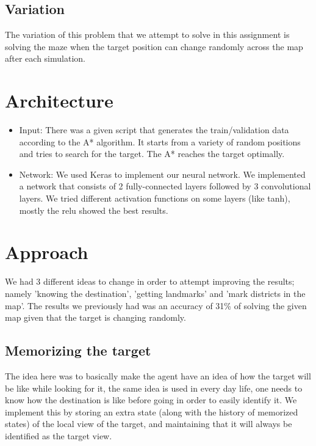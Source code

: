 \documentclass[a4paper]{article}
\begin{document}
\subsection{Variation}
The variation of this problem that we attempt to solve in this assignment is solving the maze when the target position can change randomly across the map after each simulation.

\section{Architecture}
\begin{itemize}
\item Input: There was a given script that generates the train/validation data according to the A* algorithm. It starts from a variety of random positions and tries to search for the target. The A* reaches the target optimally.

\item Network: We used Keras to implement our neural network. We implemented a network that consists of 2 fully-connected layers followed by 3 convolutional layers. We tried different activation functions on some layers (like tanh), mostly the relu showed the best results.
\end{itemize}

\section{Approach}
We had 3 different ideas to change in order to attempt improving the results; namely 'knowing the destination', 'getting landmarks' and 'mark districts in the map'. The results we previously had was an accuracy of 31\% of solving the given map given that the target is changing randomly.
\subsection{Memorizing the target}
The idea here was to basically make the agent have an idea of how the target will be like while looking for it, the same idea is used in every day life, one needs to know how the destination is like before going in order to easily identify it.
We implement this by storing an extra state (along with the history of memorized states) of the local view of the target, and maintaining that it will always be identified as the target view.
\end{document}
